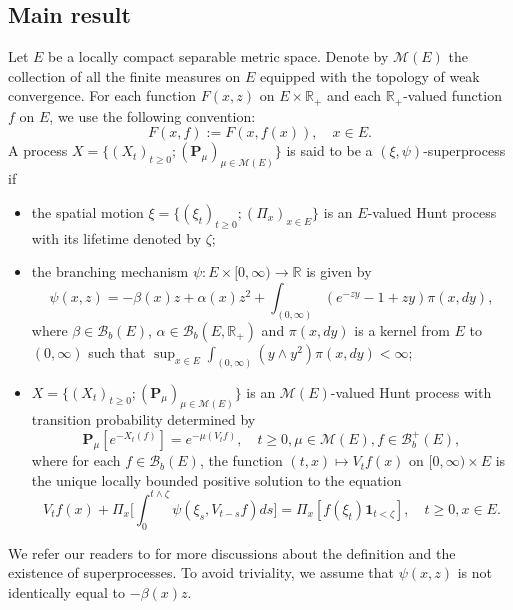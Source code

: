 \documentclass[UTF8]{pkuthss}
\theoremstyle{plain}
\theoremstyle{definition}
\numberwithin{equation}{section}
\begin{document}
\subsection{Main result}
	
    Let $E$ be a locally compact separable metric space. Denote by $\mathcal M(E)$ the collection of all the finite measures on $E$ equipped with the topology of weak convergence.
    For each function $F(x,z)$ on $E\times \mathbb R_+$ and each $\mathbb R_+$-valued function $f$ on $E$, we use the following convention:
\[
    F(x,f):= F(x,f(x)),\quad x\in E.
\]
    A process $X=\{(X_t)_{t\geq 0}; (\mathbf P_\mu)_{\mu \in \mathcal M(E)}\}$ is said to be a $(\xi,\psi)$-superprocess if
\begin{itemize}
\item
    the spatial motion $\xi=\{(\xi_t)_{t\geq 0};(\Pi_x)_{x\in E}\}$ is an $E$-valued Hunt process with its lifetime denoted by $\zeta$;
\item
    the branching mechanism $\psi: E\times[0,\infty) \to \mathbb R$ is given by
\begin{equation}
    \psi(x,z)=
    -\beta(x) z + \alpha (x) z^2 + \int_{(0,\infty)} (e^{-zy} - 1 + zy) \pi(x,dy),
\end{equation}
    where $\beta \in \mathcal B_b(E)$, $\alpha \in \mathcal B_b(E, \mathbb R_+)$ and $\pi(x,dy)$ is a kernel from $E$ to $(0,\infty)$ such that $\sup_{x\in E} \int_{(0,\infty)} (y\wedge y^2) \pi(x,dy) < \infty$;
\item
    $X=\{(X_t)_{t\geq 0}; (\mathbf P_\mu)_{\mu \in \mathcal M(E)}\}$ is an $\mathcal M(E)$-valued Hunt process with transition probability determined by
\begin{equation}
    \mathbf P_\mu [e^{-X_t(f)}] = e^{-\mu(V_tf)},
    \quad t\geq 0, \mu \in \mathcal M(E), f\in \mathcal B^+_b(E),
\end{equation}
    where for each $f\in \mathcal B_b(E)$, the function $(t,x)\mapsto V_tf(x)$ on $[0,\infty) \times E$ is the unique locally bounded positive solution to the equation
\begin{equation}
    V_tf(x) + \Pi_x \Big[  \int_0^{t\wedge \zeta} \psi(\xi_s,V_{t-s}f)ds \Big]
    = \Pi_x [ f(\xi_t)\mathbf 1_{t<\zeta} ],
    \quad t \geq 0, x \in E.
\end{equation}
\end{itemize}
    We refer our readers to \cite{Li2011Measure-valued} for more discussions about the definition and the existence of superprocesses.
    To avoid triviality, we assume that
    $\psi(x,z)$ is not identically equal to $-\beta(x)z$.
\end{document}
